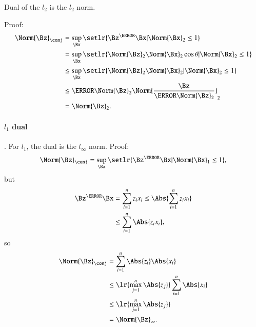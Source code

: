 Dual of the \( l_2 \) is the \( l_2 \) norm.


Proof:
%
\begin{equation}\label{eqn:convex-optimizationLecture2:164}
\begin{aligned}
\Norm{\Bz}_\conj
&= \sup_\Bx \setlr{ \Bz^\T \Bx | \Norm{\Bx}_2 \le 1 } \\
&= \sup_\Bx \setlr{ \Norm{\Bz}_2 \Norm{\Bx}_2 \cos\theta | \Norm{\Bx}_2 \le 1 } \\
&\le \sup_\Bx \setlr{ \Norm{\Bz}_2 \Norm{\Bx}_2 | \Norm{\Bx}_2 \le 1 } \\
&\le
\cancel{\Norm{\Bz}_2}
\Norm{
\frac{\Bz}{ \cancel{\Norm{\Bz}_2} }
}_2 \\
&=
\Norm{\Bz}_2.
\end{aligned}
\end{equation}
%
\paragraph{\( l_1 \) dual}.
For \( l_1 \), the dual is the \( l_\infty \) norm.  Proof:
%
\begin{equation}\label{eqn:convex-optimizationLecture2:184}
\Norm{\Bz}_\conj
=
\sup_\Bx \setlr{ \Bz^\T \Bx | \Norm{\Bx}_1 \le 1 },
\end{equation}
%
but
\begin{equation}\label{eqn:convex-optimizationLecture2:204}
\begin{aligned}
\Bz^\T \Bx
&=
\sum_{i=1}^n z_i x_i \le
\Abs{
\sum_{i=1}^n z_i x_i
} \\
&\le
\sum_{i=1}^n \Abs{z_i x_i },
\end{aligned}
\end{equation}
%
so
\begin{equation}\label{eqn:convex-optimizationLecture2:224}
\begin{aligned}
\Norm{\Bz}_\conj
&= \sum_{i=1}^n \Abs{z_i}\Abs{ x_i } \\
&\le \lr{ \max_{j=1}^n \Abs{z_j} }
\sum_{i=1}^n \Abs{ x_i } \\
&\le \lr{ \max_{j=1}^n \Abs{z_j} } \\
&=
\Norm{\Bz}_\infty.
\end{aligned}
\end{equation}
%

